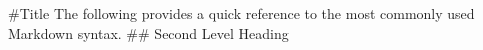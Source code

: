 #Title
The following provides a quick reference to the most commonly used Markdown syntax.
## Second Level Heading
